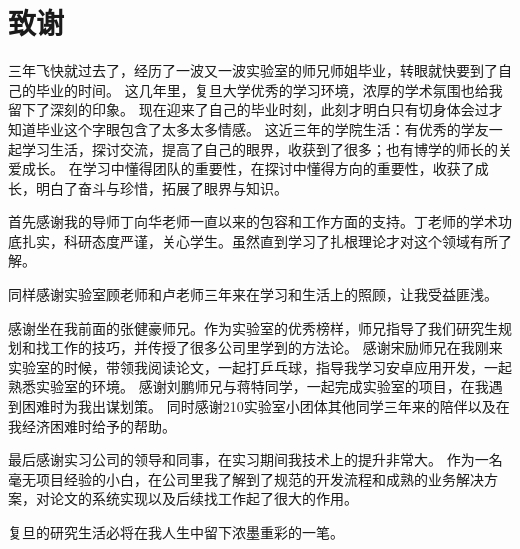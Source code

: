 \chapter{致谢}

三年飞快就过去了，经历了一波又一波实验室的师兄师姐毕业，转眼就快要到了自己的毕业的时间。 
这几年里，复旦大学优秀的学习环境，浓厚的学术氛围也给我留下了深刻的印象。
现在迎来了自己的毕业时刻，此刻才明白只有切身体会过才知道毕业这个字眼包含了太多太多情感。
这近三年的学院生活：有优秀的学友一起学习生活，探讨交流，提高了自己的眼界，收获到了很多；也有博学的师长的关爱成长。
在学习中懂得团队的重要性，在探讨中懂得方向的重要性，收获了成长，明白了奋斗与珍惜，拓展了眼界与知识。

首先感谢我的导师丁向华老师一直以来的包容和工作方面的支持。丁老师的学术功底扎实，科研态度严谨，关心学生。虽然直到学习了扎根理论才对这个领域有所了解。

同样感谢实验室顾老师和卢老师三年来在学习和生活上的照顾，让我受益匪浅。

感谢坐在我前面的张健豪师兄。作为实验室的优秀榜样，师兄指导了我们研究生规划和找工作的技巧，并传授了很多公司里学到的方法论。
感谢宋励师兄在我刚来实验室的时候，带领我阅读论文，一起打乒乓球，指导我学习安卓应用开发，一起熟悉实验室的环境。 
感谢刘鹏师兄与蒋特同学，一起完成实验室的项目，在我遇到困难时为我出谋划策。
同时感谢210实验室小团体其他同学三年来的陪伴以及在我经济困难时给予的帮助。

最后感谢实习公司的领导和同事，在实习期间我技术上的提升非常大。
作为一名毫无项目经验的小白，在公司里我了解到了规范的开发流程和成熟的业务解决方案，对论文的系统实现以及后续找工作起了很大的作用。

复旦的研究生活必将在我人生中留下浓墨重彩的一笔。
